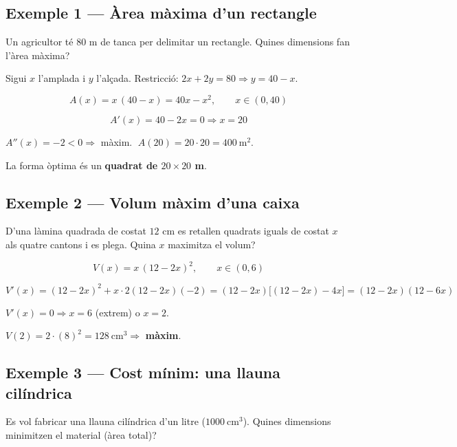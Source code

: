 \subsection{Exemple 1 --- Àrea màxima d'un rectangle}

Un agricultor té $80$ m de tanca per delimitar un rectangle. Quines dimensions fan l'àrea màxima?

Sigui $x$ l'amplada i $y$ l'alçada. Restricció: $2x + 2y = 80 \Rightarrow y = 40 - x$.

\begin{equation*}
A(x) = x\,(40 - x) = 40x - x^2, \qquad x \in (0, 40)
\end{equation*}

\begin{equation*}
A'(x) = 40 - 2x = 0 \Rightarrow x = 20
\end{equation*}

$A''(x) = -2 < 0 \Rightarrow$ màxim. $\;A(20) = 20\cdot 20 = 400\ \text{m}^2$.

La forma òptima és un \textbf{quadrat de $20\times 20$ m}.

\subsection{Exemple 2 --- Volum màxim d'una caixa}

D'una làmina quadrada de costat $12$ cm es retallen quadrats iguals de costat $x$ als quatre cantons i es plega. Quina $x$ maximitza el volum?

\begin{equation*}
V(x) = x\,(12 - 2x)^2, \qquad x \in (0, 6)
\end{equation*}

\begin{equation*}
V'(x) = (12-2x)^2 + x\cdot 2(12-2x)(-2) = (12-2x)\bigl[(12-2x) - 4x\bigr] = (12-2x)(12-6x)
\end{equation*}

$V'(x) = 0 \Rightarrow x = 6$ (extrem) o $x = 2$.

$V(2) = 2\cdot(8)^2 = 128\ \text{cm}^3 \Rightarrow$ \textbf{màxim}.

\subsection{Exemple 3 --- Cost mínim: una llauna cilíndrica}

Es vol fabricar una llauna cilíndrica d'un litre ($1000\ \text{cm}^3$). Quines dimensions minimitzen el material (àrea total)?

